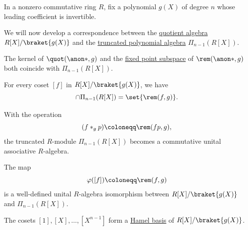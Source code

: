 \begin{proposition}\label{thm:truncated_polynomial_algebra}
  In a nonzero commutative ring \( R \), fix a polynomial \( g(X) \) of degree \( n \) whose leading coefficient is invertible.

  We will now develop a correspondence between the \hyperref[def:algebra_over_ring/quotient]{quotient algebra} \( R[X] / \braket{ g(X) } \) and the \hyperref[def:truncated_polynomial_algebra]{truncated polynomial algebra} \( \Pi_{n-1}(R[X]) \).

  \begin{thmenum}
     The kernel of \( \quot(\anon*, g) \) and the \hyperref[def:fol_fixed_point_substructure]{fixed point subspace} of \( \rem(\anon*, g) \) both coincide with \( \Pi_{n-1}(R[X]) \).

     For every coset \( [f] \) in \( R[X] / \braket{ g(X) } \), we have
    \begin{equation*}
      [f] \cap \Pi_{n-1}(R[X]) = \set{ \rem(f, g) }.
    \end{equation*}

     With the operation
    \begin{equation*}
      (f \ast_g p) \coloneqq \rem(fp, g),
    \end{equation*}
    the truncated \( R \)-module \( \Pi_{n-1}(R[X]) \) becomes a commutative unital associative \( R \)-algebra.

     The map
    \begin{equation*}
      \varphi([f]) \coloneqq \rem(f, g)
    \end{equation*}
    is a well-defined unital \( R \)-algebra isomorphism between \( R[X] / \braket{ g(X) } \) and \( \Pi_{n-1}(R[X]) \).

     The cosets \( [1], [X], \ldots, [X^{n-1}] \) form a \hyperref[def:hamel_basis]{Hamel basis} of \( R[X] / \braket{ g(X) } \).
  \end{thmenum}
\end{proposition}
